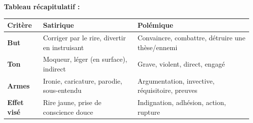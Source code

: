 \documentclass[11pt]{article}
\begin{document}
\begin{methode}
\begin{enumerate}
    \end{enumerate}
    \textbf{Tableau récapitulatif :}
    \begin{center}
    \begin{tabularx}{\linewidth}{|l|X|X|}\hline
    \rowcolor{popblueL} \textbf{Critère} & \textbf{Satirique} & \textbf{Polémique} \\ \hline
    \textbf{But} & Corriger par le rire, divertir en instruisant & Convaincre, combattre, détruire une thèse/ennemi \\ \hline
    \textbf{Ton} & Moqueur, léger (en surface), indirect & Grave, violent, direct, engagé \\ \hline
    \textbf{Armes} & Ironie, caricature, parodie, sous-entendu & Argumentation, invective, réquisitoire, preuves \\ \hline
    \textbf{Effet visé} & Rire jaune, prise de conscience douce & Indignation, adhésion, action, rupture \\ \hline
    \end{tabularx}
    \end{center}
\end{methode}
\end{document}
